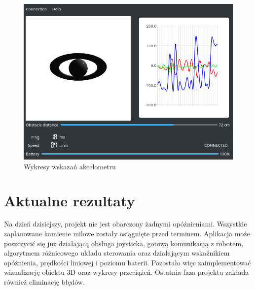 \documentclass[12pt,a4paper,polish]{article}
\begin{document}
  \begin{figure}[ht]
    \centering
    \includegraphics[width=1\textwidth]{img/app.png}
    \caption{Wykresy wskazań akcelometru}
    \label{fig:wykresy}
  \end{figure}

  
  \section{Aktualne rezultaty}
  Na dzień dzisiejszy, projekt nie jest obarczony żadnymi opóźnieniami. Wszystkie 
  zaplanowane kamienie milowe zostały osiągnięte przed terminem. Aplikacja może 
  poszczycić się już działającą obsługa joysticka, gotową komunikacją z robotem,
  algorytmem różnicowego układu sterowania oraz działającym wskaźnikiem opóźnienia,
  prędkości liniowej i poziomu baterii. Pozostało więc zaimplementować wizualizację
  obiektu 3D oraz wykresy przeciążeń. Ostatnia faza projektu zakłada również eliminację
  błędów.

  


\end{document}
